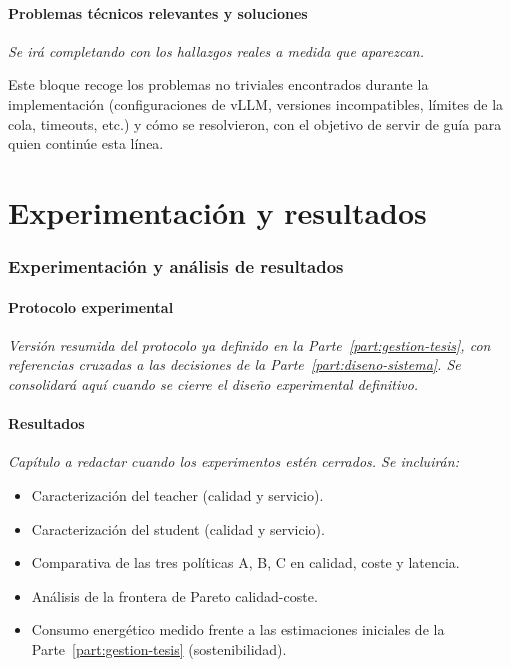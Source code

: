 \documentclass[11pt,a4paper]{article}
\begin{document}
\subsection{Problemas técnicos relevantes y soluciones}

\textit{Se irá completando con los hallazgos reales a medida que aparezcan.}

Este bloque recoge los problemas no triviales encontrados durante la implementación (configuraciones de vLLM, versiones incompatibles, límites de la cola, timeouts, etc.) y cómo se resolvieron, con el objetivo de servir de guía para quien continúe esta línea.

\part{Experimentación y resultados}
\label{part:experimentacion}

\section{Experimentación y análisis de resultados}
\label{sec:experimentacion-resultados}

\subsection{Protocolo experimental}

\textit{Versión resumida del protocolo ya definido en la Parte~\ref{part:gestion-tesis}, con referencias cruzadas a las decisiones de la Parte~\ref{part:diseno-sistema}. Se consolidará aquí cuando se cierre el diseño experimental definitivo.}

\subsection{Resultados}

\textit{Capítulo a redactar cuando los experimentos estén cerrados. Se incluirán:} 
\begin{itemize}[nosep,leftmargin=*]
\item Caracterización del teacher (calidad y servicio).
\item Caracterización del student (calidad y servicio).
\item Comparativa de las tres políticas A, B, C en calidad, coste y latencia.
\item Análisis de la frontera de Pareto calidad-coste.
\item Consumo energético medido frente a las estimaciones iniciales de la Parte~\ref{part:gestion-tesis} (sostenibilidad).
\end{itemize}
\end{document}

